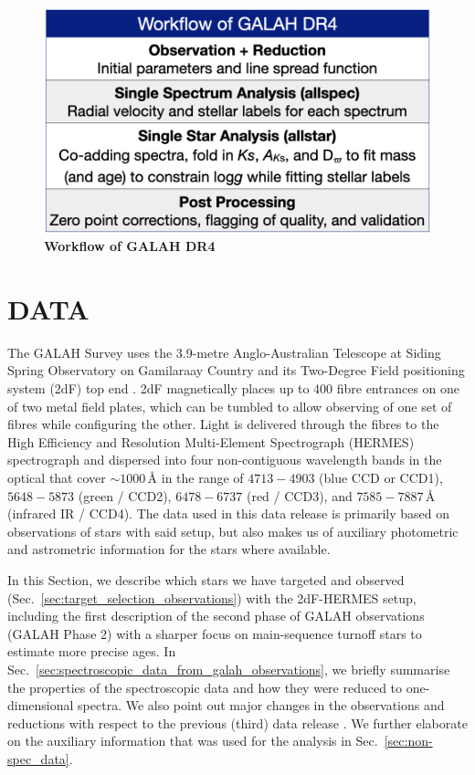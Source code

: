 \documentclass[
  journal=pasa,
  manuscript=research-paper, %
  year=2024,
  volume=37
]{cup-journal}
\begin{document}
\begin{figure}[ht]
 \centering
 \includegraphics[width=\textwidth]{figures/workflow_galah_dr4.png}
 \caption{\textbf{Workflow of GALAH DR4}}
 \label{fig:workflow_galah_dr4}
\end{figure}

\section{DATA}
\label{sec:data}

The GALAH Survey uses the 3.9-metre Anglo-Australian Telescope at Siding Spring Observatory on Gamilaraay Country and its Two-Degree Field positioning system (2dF) top end \citep{Lewis2002}. 2dF magnetically places up to 400 fibre entrances on one of two metal field plates, which can be tumbled to allow observing of one set of fibres while configuring the other. Light is delivered through the fibres to the High Efficiency and Resolution Multi-Element Spectrograph (HERMES) spectrograph \citep{Barden2010, Brzeski2011, Heijmans2012, Farrell2014, Sheinis2015} and dispersed into four non-contiguous wavelength bands in the optical that cover $\sim 1000\,\text{\AA}$ in the range of $4713-4903$ (blue CCD or CCD1), $5648-5873$ (green / CCD2), $6478-6737$ (red / CCD3), and $7585-7887\,\text{\AA}$ (infrared IR / CCD4). The data used in this data release is primarily based on observations of stars with said setup, but also makes us of auxiliary photometric and astrometric information for the stars where available.

In this Section, we describe which stars we have targeted and observed (Sec.~\ref{sec:target_selection_observations}) with the 2dF-HERMES setup, including the first description of the second phase of GALAH observations (GALAH Phase 2) with a sharper focus on main-sequence turnoff stars to estimate more precise ages. In Sec.~\ref{sec:spectroscopic_data_from_galah_observations}, we briefly summarise the properties of the spectroscopic data and how they were reduced to one-dimensional spectra. We also point out major changes in the observations and reductions with respect to the previous (third) data release \citep{Buder2021}. We further elaborate on the auxiliary information that was used for the analysis in Sec.~\ref{sec:non-spec_data}.
\end{document}
